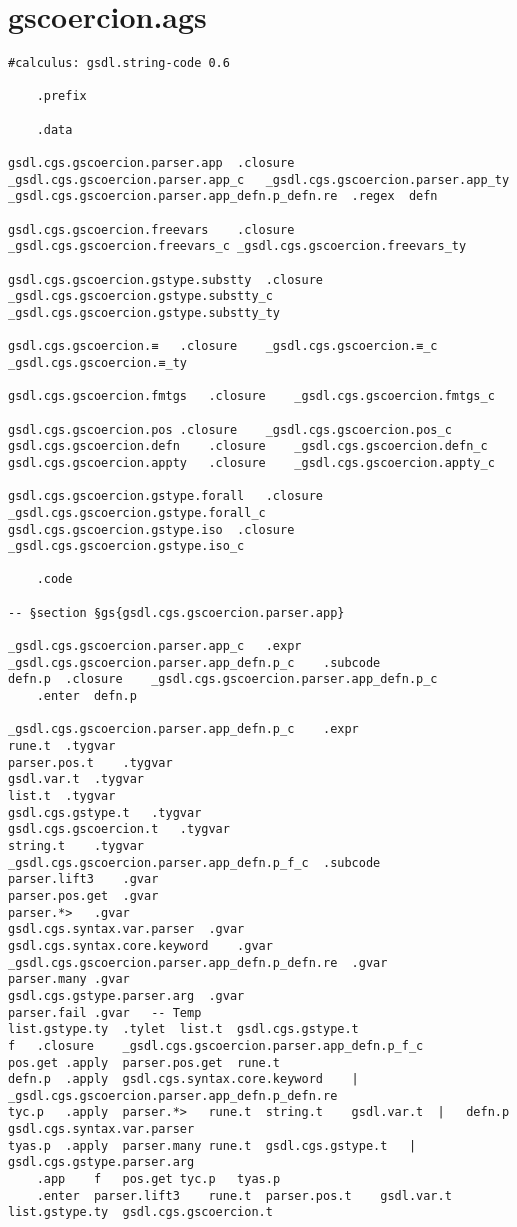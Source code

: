 \documentclass{report}
\begin{document}
\section{gscoercion.ags}

\begin{verbatim}
#calculus: gsdl.string-code 0.6

	.prefix

	.data

gsdl.cgs.gscoercion.parser.app	.closure	_gsdl.cgs.gscoercion.parser.app_c	_gsdl.cgs.gscoercion.parser.app_ty
_gsdl.cgs.gscoercion.parser.app_defn.p_defn.re	.regex	defn

gsdl.cgs.gscoercion.freevars	.closure	_gsdl.cgs.gscoercion.freevars_c	_gsdl.cgs.gscoercion.freevars_ty

gsdl.cgs.gscoercion.gstype.substty	.closure	_gsdl.cgs.gscoercion.gstype.substty_c	_gsdl.cgs.gscoercion.gstype.substty_ty

gsdl.cgs.gscoercion.≡	.closure	_gsdl.cgs.gscoercion.≡_c	_gsdl.cgs.gscoercion.≡_ty

gsdl.cgs.gscoercion.fmtgs	.closure	_gsdl.cgs.gscoercion.fmtgs_c

gsdl.cgs.gscoercion.pos	.closure	_gsdl.cgs.gscoercion.pos_c
gsdl.cgs.gscoercion.defn	.closure	_gsdl.cgs.gscoercion.defn_c
gsdl.cgs.gscoercion.appty	.closure	_gsdl.cgs.gscoercion.appty_c

gsdl.cgs.gscoercion.gstype.forall	.closure	_gsdl.cgs.gscoercion.gstype.forall_c
gsdl.cgs.gscoercion.gstype.iso	.closure	_gsdl.cgs.gscoercion.gstype.iso_c

	.code

-- §section §gs{gsdl.cgs.gscoercion.parser.app}

_gsdl.cgs.gscoercion.parser.app_c	.expr
_gsdl.cgs.gscoercion.parser.app_defn.p_c	.subcode
defn.p	.closure	_gsdl.cgs.gscoercion.parser.app_defn.p_c
	.enter	defn.p

_gsdl.cgs.gscoercion.parser.app_defn.p_c	.expr
rune.t	.tygvar
parser.pos.t	.tygvar
gsdl.var.t	.tygvar
list.t	.tygvar
gsdl.cgs.gstype.t	.tygvar
gsdl.cgs.gscoercion.t	.tygvar
string.t	.tygvar
_gsdl.cgs.gscoercion.parser.app_defn.p_f_c	.subcode
parser.lift3	.gvar
parser.pos.get	.gvar
parser.*>	.gvar
gsdl.cgs.syntax.var.parser	.gvar
gsdl.cgs.syntax.core.keyword	.gvar
_gsdl.cgs.gscoercion.parser.app_defn.p_defn.re	.gvar
parser.many	.gvar
gsdl.cgs.gstype.parser.arg	.gvar
parser.fail	.gvar	-- Temp
list.gstype.ty	.tylet	list.t	gsdl.cgs.gstype.t
f	.closure	_gsdl.cgs.gscoercion.parser.app_defn.p_f_c
pos.get	.apply	parser.pos.get	rune.t
defn.p	.apply	gsdl.cgs.syntax.core.keyword	|	_gsdl.cgs.gscoercion.parser.app_defn.p_defn.re
tyc.p	.apply	parser.*>	rune.t	string.t	gsdl.var.t	|	defn.p	gsdl.cgs.syntax.var.parser
tyas.p	.apply	parser.many	rune.t	gsdl.cgs.gstype.t	|	gsdl.cgs.gstype.parser.arg
	.app	f	pos.get	tyc.p	tyas.p
	.enter	parser.lift3	rune.t	parser.pos.t	gsdl.var.t	list.gstype.ty	gsdl.cgs.gscoercion.t


\end{verbatim}
\end{document}
